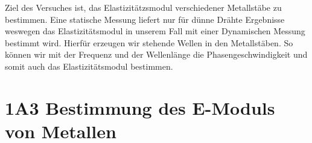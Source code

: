 \documentclass[twoside]{protokoll}
\begin{document}
\begin{versuchsziele}
Ziel des Versuches ist, das Elastizitätzsmodul verschiedener Metallstäbe zu bestimmen.
Eine statische Messung liefert nur für dünne Drähte Ergebnisse weswegen das Elastizitätsmodul in unserem Fall mit einer Dynamischen Messung bestimmt wird. Hierfür erzeugen wir stehende Wellen in den Metallstäben. So können wir mit der Frequenz und der Wellenlänge die Phasengeschwindigkeit und somit auch das Elastizitätsmodul bestimmen. 
\end{versuchsziele}

 
\section{1A3 Bestimmung des E-Moduls von Metallen}

\end{document}
